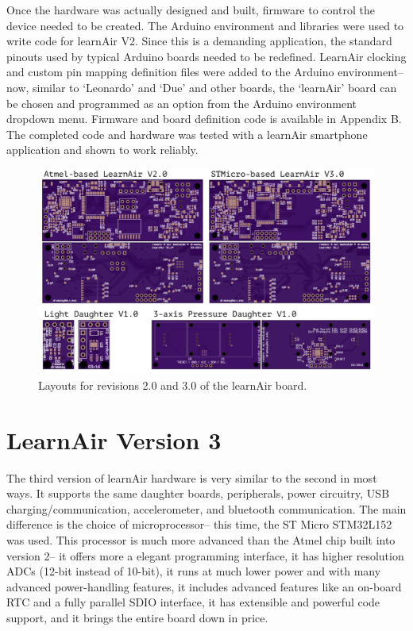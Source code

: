 Once the hardware was actually designed and built, firmware to control the device needed to be created.  The Arduino environment and libraries were used to write code for learnAir V2.  Since this is a demanding application, the standard pinouts used by typical Arduino boards needed to be redefined.  LearnAir clocking and custom pin mapping definition files were added to the Arduino environment-- now, similar to `Leonardo' and `Due' and other boards, the `learnAir' board can be chosen and programmed as an option from the Arduino environment dropdown menu.  Firmware and board definition code is available in Appendix B.  The completed code and hardware was tested with a learnAir smartphone application and shown to work reliably.

\FloatBarrier

\begin{figure}[htb]
 	\includegraphics[width=\textwidth]{visuals/layouts}               
 	 \caption{Layouts for revisions 2.0 and 3.0 of the learnAir board.}
  	\label{fig:layouts}
\end{figure}


\FloatBarrier
\section{LearnAir Version 3}
\FloatBarrier

The third version of learnAir hardware is very similar to the second in most ways.  It supports the same daughter boards, peripherals, power circuitry, USB charging/communication, accelerometer, and bluetooth communication.  The main difference is the choice of microprocessor-- this time, the ST Micro STM32L152 was used.  This processor is much more advanced than the Atmel chip built into version 2-- it offers more a elegant programming interface, it has higher resolution ADCs (12-bit instead of 10-bit), it runs at much lower power and with many advanced power-handling features, it includes advanced features like an on-board RTC and a fully parallel SDIO interface, it has extensible and powerful code support, and it brings the entire board down in price.  

